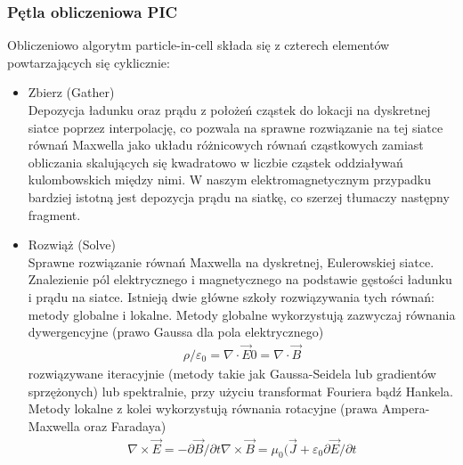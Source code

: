    \subsubsection{Pętla obliczeniowa PIC}
    Obliczeniowo algorytm particle-in-cell składa się z czterech elementów
    powtarzających się cyklicznie:
    \begin{itemize}
        \item Zbierz (Gather)\\
    Depozycja ładunku oraz prądu z położeń cząstek do lokacji na dyskretnej
    siatce poprzez interpolację, co pozwala na sprawne rozwiązanie na tej
    siatce równań Maxwella jako układu różnicowych równań cząstkowych zamiast
    obliczania skalujących się kwadratowo w liczbie cząstek oddziaływań
    kulombowskich między nimi.  W naszym elektromagnetycznym przypadku bardziej
    istotną jest depozycja prądu na siatkę, co szerzej tłumaczy następny
    fragment.
    \item Rozwiąż (Solve)\\
    Sprawne rozwiązanie równań Maxwella na dyskretnej, Eulerowskiej siatce.
    Znalezienie pól elektrycznego i magnetycznego na podstawie gęstości ładunku
    i prądu na siatce.  Istnieją dwie główne szkoły rozwiązywania tych równań:
    metody globalne i lokalne. Metody globalne wykorzystują zazwyczaj równania
    dywergencyjne (prawo Gaussa dla pola elektrycznego)
    \begin{align}
        \rho / \varepsilon_0 = \nabla \cdot \vec{E}
        0 = \nabla \cdot \vec{B}
        \label{divergence-equations}
    \end{align}
    rozwiązywane iteracyjnie (metody takie jak Gaussa-Seidela lub gradientów
    sprzężonych)  lub spektralnie, przy użyciu transformat
    Fouriera bądź Hankela.  Metody lokalne z kolei
    wykorzystują równania rotacyjne (prawa Ampera-Maxwella oraz Faradaya)
    \begin{align}
        \nabla \times \vec{E} = -\partial \vec{B} / \partial t
        \nabla \times \vec{B} = \mu_0 \Big( \vec{J} + \varepsilon_0 \partial \vec{E} / \partial t
        \label{rotation-equations}
    \end{align}


\end{itemize}
